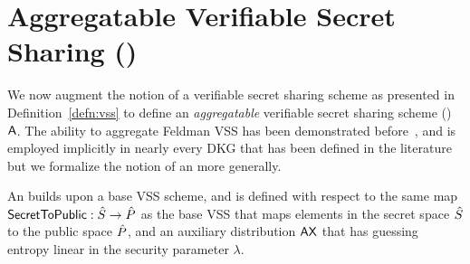 \section{Aggregatable Verifiable Secret Sharing (\AVSS)}
\label{asym-vss}

We now augment the notion of a verifiable secret sharing scheme as presented in Definition~\ref{defn:vss}
to define an \emph{aggregatable} verifiable secret sharing scheme (\AVSS) $\mathsf{A}$.
The ability to aggregate Feldman VSS has been demonstrated before~\cite{GurkanJMMST21},
and is employed implicitly in nearly every DKG that has been defined in the literature~\cite{Pedersen91,GennaroJKR03,Groth21,Lindell22}
but we formalize the notion of an \AVSS more generally.
%

An \AVSS builds upon a base VSS scheme,
and is defined with respect to the same map $\mathsf{SecretToPublic} : \hat{S} \rightarrow \hat{P}$ as the base VSS that maps elements in the secret space $\hat{S}$ to the public space $\hat{P}$,
and an auxiliary distribution
$\mathsf{AX}$ that has guessing entropy linear in the security parameter $\lambda$.

